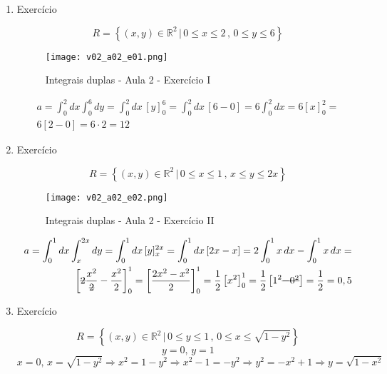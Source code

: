 \begin{enumerate}
	\item Exercício
	
	\begin{equation*}
		R = \left\{(x, y) \in \mathbb{R}^2 \,|\, 0 \leq x \leq 2 \,,\, 0 \leq y \leq 6 \right\}	
	\end{equation*}
	
	\begin{figure}[htb]
		\caption{Integrais duplas - Aula 2 - Exercício I}
		\label{v02_a02_e01}
		\centering
		\texttt{[image: v02\_a02\_e01.png]}		
	\end{figure}
	
	\begin{align*}
		a = \int_0^2 dx \int_0^6 dy = \int_0^2 dx\, [y]_0^6 = \int_0^2 dx\, [6 - 0] = 6\int_0^2 dx = 6[x]_0^2 =\\ 6[2 - 0] = 6 \cdot 2 = 12
	\end{align*}
		
	\item Exercício
	
	\begin{equation*}
		R = \left\{(x, y) \in \mathbb{R}^2 \,|\, 0 \leq x \leq 1 \,,\, x \leq y \leq 2x \right\}
	\end{equation*}
							
	\begin{figure}[htb]
		\caption{Integrais duplas - Aula 2 - Exercício II}
		\label{v02_a02_e02}
		\centering
		\texttt{[image: v02\_a02\_e02.png]}		
	\end{figure}
	
	\begin{align*}
		a = \int_0^1 dx \int_{x}^{2x} dy = \int_0^1 dx\, [y]_{x}^{2x} = \int_0^1 dx\, [2x - x] = 2\int_0^1 x\, dx - \int_0^1 x\, dx =\\ \left[\overstrike{2}\dfrac{x^2}{\overstrike{2}} - \dfrac{x^2}{2}\right]_0^1 = \left[\dfrac{2x^2 - x^2}{2}\right]_0^1 = \dfrac{1}{2}\left[x^2\right]_0^1 = \dfrac{1}{2}\left[1^2 \overstrike{- 0^2}\right] = \dfrac{1}{2} = 0,5
	\end{align*}
		
	\item Exercício
	
	\begin{equation*}
		R = \left\{(x, y) \in \mathbb{R}^2 \,|\, 0 \leq y \leq 1 \,,\, 0 \leq x \leq \sqrt{1 - y^2} \right\}
	\end{equation*}
	\begin{equation*}
		y = 0,\, y = 1
	\end{equation*}
	\begin{equation*}
		x = 0,\, x = \sqrt{1 - y^2} \Rightarrow x^2 = 1 - y^2 \Rightarrow x^2 - 1 = -y^2 \Rightarrow y^2 = -x^2 + 1 \Rightarrow y = \sqrt{1 -x^2}
	\end{equation*}
					

\end{enumerate}
